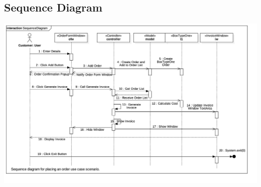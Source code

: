 \documentclass[12pt]{article}
\begin{document}
\subsection{Sequence Diagram}
\includegraphics[scale=.20]{./diagrams/SequenceDiagram.jpg}
\newpage
\end{document}
